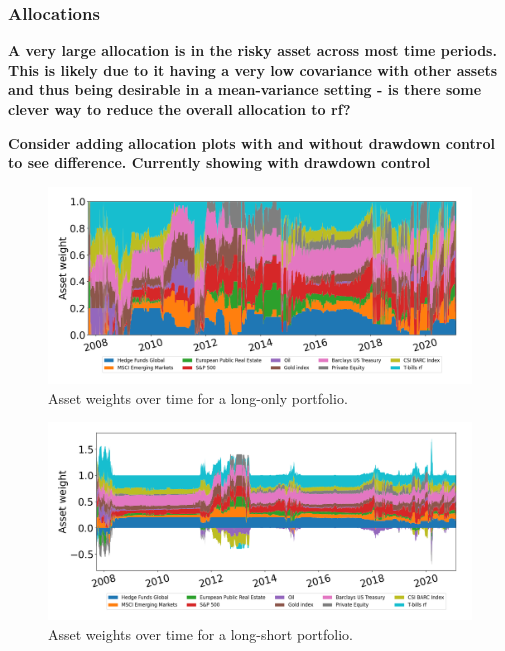 \subsubsection*{Allocations}

\textbf{A very large allocation is in the risky asset across most time periods. This is likely due to it having a very low covariance with other assets and thus being desirable in a mean-variance setting - is there some clever way to reduce the overall allocation to rf?}

\textbf{Consider adding allocation plots with and without drawdown control to see difference. Currently showing with drawdown control}

\begin{figure}[H]
    \centering
    \includegraphics[width=1\textwidth]{analysis/portfolio_exercise/images/mle/weights_lo.png}
    \caption[Asset weights over time for a long-only portfolio]{Asset weights over time for a long-only portfolio.}
    \label{fig:MPC_port_weights_lo}
\end{figure}

\begin{figure}[H]
    \centering
    \includegraphics[width=1\textwidth]{analysis/portfolio_exercise/images/mle/weights_ls.png}
    \caption[Asset weights over time for a long-short portfolio]{Asset weights over time for a long-short portfolio.}
    \label{fig:MPC_port_weights_ls}
\end{figure}

